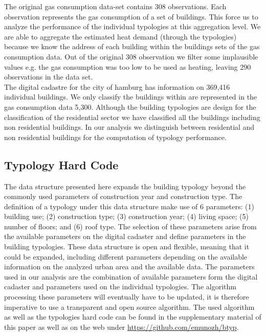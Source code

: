 \documentclass[authoryear,preprint,review,12pt]{elsarticle}
\begin{document}
\begin{linenumbers}
The original gas consumption data-set contains 308 observations. Each
observation represents the gas consumption of a set of buildings. This force us
to analyze the performance of the individual typologies at this aggregation
level. We are able to aggregate the estimated heat demand (through the
typologies) because we know the address of each building within the buildings
sets of the gas consumption data. Out of the original 308 observation we
filter some implausible values e.g. the gas consumption was too low to be used
as heating, leaving 290 observations in the data set.\\

The digital cadastre for the city of hamburg has information on 369,416
individual buildings. We only classify the buildings within are represented in
the gas consumption data 5,300. Although the building typologies are design for
the classification of the residential sector we have classified all the buildings
including non residential buildings. In our analysis we distinguish between
residential and non residential buildings for the computation of typology
performance.\\

\subsection{Typology Hard Code}\label{sub-sec:hcode}

The data structure presented here expands the building typology beyond the
commonly used parameters of construction year and construction type. The
definition of a typology under this data structure make use of 6 parameters:
(1) building use;
(2) construction type;
(3) construction year;
(4) living space;
(5) number of floors; and
(6) roof type.
The selection of these parameters arise from the available parameters on the
digital cadaster and define parameters in the building typologies. These data
structure is open and flexible, meaning that it could be expanded, including
different parameters depending on the available information on the analyzed
urban area and the available data. The parameters used in our analysis are the
combination of available parameters form the digital cadaster and parameters
used on the individual typologies. The algorithm processing these parameters
will eventually have to be updated, it is therefore imperative to use a
transparent and open source algorithm. The used algorithm as well as the
typologies hard code can be found in the supplementary material of this paper
as well as on the web under \url{https://github.com/emunozh/btyp}.\\


\end{linenumbers}
\end{document}
